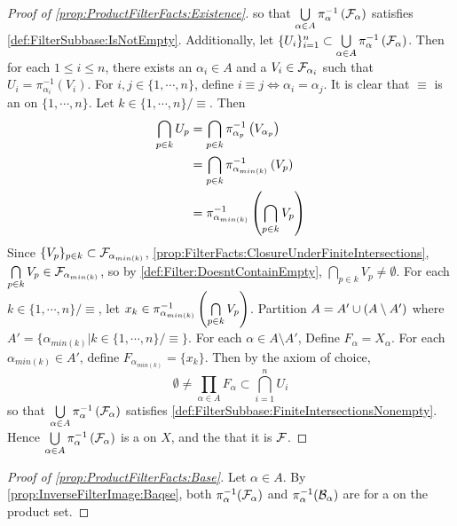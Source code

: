 \begin{prop}
\begin{proof}[Proof of \ref{prop:ProductFilterFacts:Existence}]
    so that $\bigcup\limits_{\alpha \in A} \pi_\alpha^{-1}\left( \mathcal{F}_\alpha\right)$ 
    satisfies \ref{def:FilterSubbase:IsNotEmpty}.
    Additionally, let $\{U_i\}_{i=1}^n \subset \bigcup\limits_{\alpha \in A} \pi_\alpha^{-1}\left( \mathcal{F}_\alpha\right)$.
    Then for each $1 \leq i \leq n$, there exists an $\alpha_i \in A$ 
    and a $V_i \in \mathcal{F}_{\alpha_i}$ such that 
    $U_i = \pi_{\alpha_i}^{-1}(V_i)$.
    For $i,j \in \{1,\cdots,n\}$, define $i \equiv j \iff \alpha_i = \alpha_j$.
    It is clear that $\equiv$ is an \EquivalenceRelation on $\{1,\cdots,n\}$.
    Let $k \in \{1, \cdots, n\} / \equiv$. Then 
    \begin{align*}
        \bigcap\limits_{p \in k} U_p & = \bigcap\limits_{p \in k} \pi_{\alpha_p}^{-1}\left( V_{\alpha_p}\right) \\
        & =\bigcap\limits_{p \in k} \pi_{\alpha_{min(k)}}^{-1}\left( V_{p}\right) \\
        & = \pi_{\alpha_{min(k)}}^{-1} \left( \bigcap\limits_{p \in k} V_{p}\right)
    \end{align*}
    Since $\{V_p\}_{p \in k} \subset \mathcal{F}_{\alpha_{min(k)}}$, 
    \ref{prop:FilterFacts:ClosureUnderFiniteIntersections}, 
    $\bigcap\limits_{p \in k} V_p  \in \mathcal{F}_{\alpha_{min(k)}}$, so 
    by \ref{def:Filter:DoesntContainEmpty}, $\bigcap\limits_{p \in k} V_p \neq \emptyset$. 
    For each $k \in \{1,\cdots,n\}/\equiv$, let
    $x_k \in \pi_{\alpha_{min(k)}}^{-1}\left( \bigcap\limits_{p \in k}V_p\right)$.
    Partition $A= A' \cup \left( A \setminus A'\right)$ where 
    $A' = \{\alpha_{min(k)} | k \in \{1,\cdots,n\} /\equiv\}$. 
    For each $\alpha \in A \setminus A'$, Define $F_\alpha = X_\alpha$.
    For each $\alpha_{min(k)} \in A'$, define $F_{\alpha_{min(k)}} = \{x_k\}$.
    Then by the axiom of choice, 
    \begin{equation*}
    \emptyset \neq \prod\limits_{\alpha \in A} F_\alpha \subset \bigcap\limits_{i=1}^n U_i
    \end{equation*}
    so that $\bigcup\limits_{\alpha \in A} \pi_\alpha^{-1}\left( \mathcal{F}_\alpha\right)$
    satisfies \ref{def:FilterSubbase:FiniteIntersectionsNonempty}.
    Hence $\bigcup\limits_{\alpha \in A} \pi_\alpha^{-1}\left( \mathcal{F}_\alpha\right)$ is a \FilterSubbasis
    on $X$, and the \Filter that it \FilterGenerates is $\mathcal{F}$. 
\end{proof}
\begin{proof}[Proof of \ref{prop:ProductFilterFacts:Base}]
    Let $\alpha \in A$. 
    By \ref{prop:InverseFilterImage:Baqse}, both 
    $\pi_\alpha^{-1}(\mathcal{F}_\alpha)$ and $\pi_{\alpha}^{-1}(\mathcal{B}_\alpha)$ are \FilterBases 
    for a \Filter on the product set. 

\end{proof}
\end{prop}
